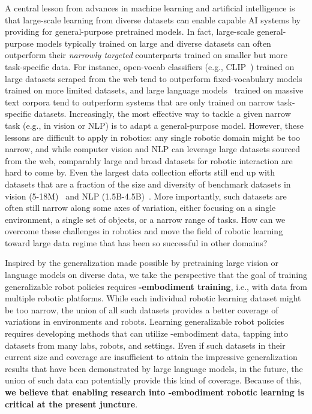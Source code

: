 A central lesson from advances in machine learning and artificial intelligence is that large-scale learning from diverse datasets can enable capable AI systems by providing for general-purpose pretrained models. In fact, large-scale general-purpose models typically trained on large and diverse datasets can often outperform their \emph{narrowly targeted} counterparts trained on smaller but more task-specific data. For instance, open-vocab classifiers (e.g., CLIP~\cite{radford2021learning}) trained on large datasets scraped from the web tend to outperform fixed-vocabulary models trained on more limited datasets, and large language models~\cite{openai2023gpt4,anil2023palm} trained on massive text corpora tend to outperform systems that are only trained on narrow task-specific datasets. Increasingly, the most effective way to tackle a given narrow task (e.g., in vision or NLP) is to adapt a general-purpose model. However, these lessons are difficult to apply in robotics: any single robotic domain might be too narrow, and while computer vision and NLP can leverage large datasets sourced from the web, comparably large and broad datasets for robotic interaction are hard to come by. Even the largest data collection efforts still end up with datasets that are a fraction of the size and diversity of benchmark datasets in vision (5-18M)~\cite{Weyand_2020_CVPR, tencent-ml-images-2019} and NLP (1.5B-4.5B)~\cite{lehmann-2017, muhleisen2012web}. More importantly, such datasets are often still narrow along some axes of variation, either focusing on a single environment, a single set of objects, or a narrow range of tasks. How can we overcome these challenges in robotics and move the field of robotic learning toward large data regime that has been so successful in other domains?

Inspired by the generalization made possible by pretraining large vision or language models on diverse data, we take the perspective that the goal of training generalizable robot policies requires \textbf{\cro-embodiment training}, i.e., with data from multiple robotic platforms.
While each individual robotic learning dataset might be too narrow, the union of all such datasets provides a better coverage of variations in environments and robots. Learning generalizable robot policies requires developing methods that can utilize \cro-embodiment data, tapping into datasets from many labs, robots, and settings. Even if such datasets in their current size and coverage are insufficient to attain the impressive generalization results that have been demonstrated by large language models, in the future, the union of such data can potentially provide this kind of coverage. 
Because of this, \textbf{we believe that enabling research into \cro-embodiment robotic learning is critical at the present juncture}.

